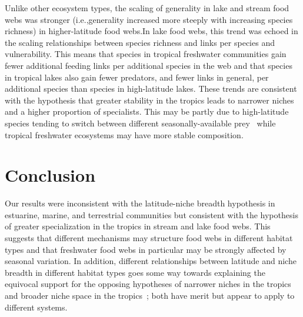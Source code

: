 \documentclass[12pt]{article}
\begin{document}
\begin{spacing}{1.0}
  Unlike other ecosystem types, the scaling of generality in lake and stream
  food webs was stronger (i.e.,generality increased more steeply with
  increasing species richness) in higher-latitude food webs.In lake food webs,
  this trend was echoed in the scaling relationships between species richness
  and links per species and vulnerability. This means that species in tropical
  freshwater communities gain fewer additional feeding links per additional
  species in the web and that species in tropical lakes also gain fewer
  predators, and fewer links in general, per additional species than species
  in high-latitude lakes. These trends are consistent with the hypothesis that
  greater stability in the tropics leads to narrower
  niches~\citep{Vazquez2004} and a higher proportion of specialists. This may
  be partly due to high-latitude species tending to switch between different
  seasonally-available prey~\citep{Isaac2012,Wilhelm1999} while tropical
  freshwater ecosystems may have more stable composition.


\section*{Conclusion}

  Our results were inconsistent with the latitude-niche breadth hypothesis in estuarine, marine,
  and terrestrial communities but consistent with the hypothesis of greater specialization
  in the tropics in stream and lake food webs. This suggests that different mechanisms may structure
  food webs in different habitat types and that freshwater food webs in particular may be strongly
  affected by seasonal variation. In addition, different relationships between latitude and niche
  breadth in different habitat types goes some way towards explaining the equivocal support for
  the opposing hypotheses of narrower niches in the tropics~\citep{Vazquez2004} and broader 
  niche space in the tropics~\citep{Davies2007}; both have merit but appear
  to apply to different systems.


\newpage

\end{spacing}
\newpage
\end{document}
